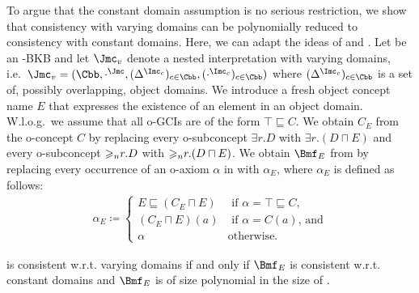 To argue that the constant domain assumption is no serious restriction, we show that consistency
with varying domains can be polynomially reduced to consistency with constant domains. Here, we can adapt
the ideas of \cite{GKW+-03} and \cite{LuWZ-TIME08}. Let \Bmf be an \LMLO-BKB and let $\J_{v}$ denote a nested
interpretation with varying domains, i.e.\
$\J_{v} = (\Cbb,\cdot^{\J},(\Delta^{\I_{c}})_{c\in\Cbb},(\cdot^{\I_c})_{c\in\Cbb})$ where
$(\Delta^{\I_{c}})_{c\in\Cbb}$ is a set of, possibly overlapping, object domains. We introduce a
fresh object concept name $E$ that expresses the existence of an element in an object
domain. W.l.o.g.\ we assume that all o-GCIs are of the form $\top \sqsubseteq C$. We obtain $C_{E}$
from the o-concept $C$ by replacing every o-subconcept $\exists r.D$ with $\exists r.(D \sqcap
E)$ and every o-subconcept ${\geqslant_{n}}r.D$ with ${\geqslant_{n}}r.(D \sqcap E)$. We
obtain $\Bmf_{E}$ from \Bmf by replacing  every occurrence of an o-axiom $\alpha$ in \Bmf with
$\alpha_{E}$, where $\alpha_{E}$ is defined as follows:
\begin{align*}
  \alpha_{E} \coloneqq
  \begin{cases}
    E \sqsubseteq (C_{E} \sqcap E) & \text{ if $\alpha = \top \sqsubseteq C$,} \\
    (C_{E}\sqcap E)(a) & \text{ if $\alpha = C(a)$, and} \\
    \alpha & \text{otherwise.}
  \end{cases}
\end{align*}
%
\begin{proposition}\label{prop:constant-domain-assumption}
  \Bmf is consistent w.r.t. varying domains if and only if $\Bmf_{E}$ is consistent w.r.t. constant
  domains and $\Bmf_{E}$ is of size polynomial in the size of \Bmf.
\end{proposition}

